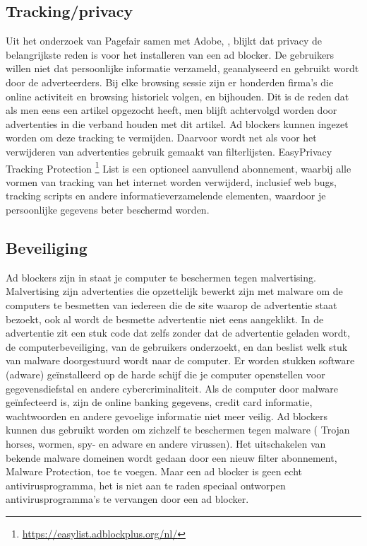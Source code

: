 \documentclass[pdftex,a4paper,12pt,twoside]{report}
\begin{document}
\subsection{Tracking/privacy}
\label{sec tracking/privacy}
Uit het onderzoek van Pagefair samen met Adobe, \cite{PageFair2015}, blijkt dat privacy de belangrijkste reden is voor het installeren van een ad blocker. De gebruikers willen niet dat persoonlijke informatie verzameld, geanalyseerd en gebruikt wordt door de adverteerders. Bij elke browsing sessie zijn er honderden firma's die online activiteit en browsing historiek volgen, en bijhouden. Dit is de reden dat als men eens een artikel opgezocht heeft, men blijft achtervolgd worden door advertenties in die verband houden met dit artikel. Ad blockers kunnen ingezet worden om deze tracking te vermijden. Daarvoor wordt net als voor het verwijderen van advertenties gebruik gemaakt van filterlijsten. EasyPrivacy Tracking Protection \footnote{\url{https://easylist.adblockplus.org/nl/}} List is een optioneel aanvullend abonnement, waarbij alle vormen van tracking van het internet worden verwijderd, inclusief web bugs, tracking scripts en andere informatieverzamelende elementen, waardoor je persoonlijke gegevens beter beschermd worden.

\subsection{Beveiliging}
\label{sec Beveiliging}
Ad blockers zijn in staat je computer te beschermen tegen malvertising. Malvertising zijn advertenties die opzettelijk bewerkt zijn met malware om de computers te besmetten van iedereen die de site waarop de advertentie staat bezoekt, ook al wordt de besmette advertentie niet eens aangeklikt. 
In de advertentie zit een stuk code dat zelfs zonder dat de advertentie geladen wordt, de computerbeveiliging, van de gebruikers onderzoekt, en dan beslist welk stuk van malware doorgestuurd wordt naar de computer. Er worden stukken software (adware) geïnstalleerd op de harde schijf die je computer openstellen voor gegevensdiefstal en andere cybercriminaliteit. Als de computer door malware geïnfecteerd is, zijn de online banking gegevens, credit card informatie, wachtwoorden en andere gevoelige informatie niet meer veilig. 
Ad blockers kunnen dus gebruikt worden om zichzelf te beschermen tegen malware ( Trojan horses, wormen, spy- en adware en andere virussen). Het uitschakelen van bekende malware domeinen wordt gedaan door een nieuw filter abonnement, Malware Protection, toe te voegen. Maar een ad blocker is geen echt antivirusprogramma, het is niet aan te raden speciaal ontworpen antivirusprogramma's te vervangen door een ad blocker. 
\end{document}
